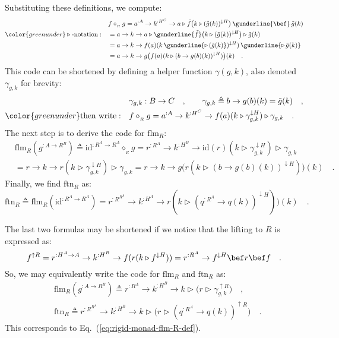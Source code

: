 Substituting these definitions, we compute:
\begin{align*}
 & f\diamond_{_{R}}g=a^{:A}\rightarrow k^{:H^{C}}\rightarrow a\triangleright\tilde{f}\big(k\triangleright(\tilde{g}(k))^{\downarrow H}\big)\,\gunderline{\bef}\,\tilde{g}(k)\\
{\color{greenunder}\triangleright\text{-notation}:}\quad & =a\rightarrow k\rightarrow a\triangleright\gunderline{\tilde{f}}\big(k\triangleright(\tilde{g}(k))^{\downarrow H}\big)\triangleright\tilde{g}(k)\\
 & =a\rightarrow k\rightarrow f(a)(k\,\gunderline{\triangleright\,(\tilde{g}(k)})^{\downarrow H})\,\gunderline{\triangleright\,\tilde{g}(k)}\\
 & =a\rightarrow k\rightarrow g\big(f(a)(k\triangleright(b\rightarrow g(b)(k))^{\downarrow H})\big)(k)\quad.
\end{align*}
This code can be shortened by defining a helper function $\gamma(g,k)$,
also denoted $\gamma_{g,k}$ for brevity:
\begin{align*}
 & \gamma_{g,k}:B\rightarrow C\quad,\quad\quad\gamma_{g,k}\triangleq b\rightarrow g(b)(k)=\tilde{g}(k)\quad,\\
{\color{greenunder}\text{then write}:}\quad & f\diamond_{_{R}}g=a^{:A}\rightarrow k^{:H^{C}}\rightarrow f(a)(k\triangleright\gamma_{g,k}^{\downarrow H})\triangleright\gamma_{g,k}\quad.
\end{align*}
The next step is to derive the code for $\text{flm}_{R}$:
\begin{align*}
 & \text{flm}_{R}(g^{:A\rightarrow R^{B}})\triangleq\text{id}^{:R^{A}\rightarrow R^{A}}\diamond_{_{R}}g=r^{:R^{A}}\rightarrow k^{:H^{B}}\rightarrow\text{id}\left(r\right)(k\triangleright\gamma_{g,k}^{\downarrow H})\triangleright\gamma_{g,k}\\
 & =r\rightarrow k\rightarrow r(k\triangleright\gamma_{g,k}^{\downarrow H})\triangleright\gamma_{g,k}=r\rightarrow k\rightarrow g\big(r(k\triangleright(b\rightarrow g(b)(k))^{\downarrow H})\big)(k)\quad.
\end{align*}
Finally, we find $\text{ftn}_{R}$ as:
\[
\text{ftn}_{R}\triangleq\text{flm}_{R}(\text{id}^{:R^{A}\rightarrow R^{A}})=r^{:R^{R^{A}}}\rightarrow k^{:H^{A}}\rightarrow r(k\triangleright(q^{:R^{A}}\rightarrow q(k))^{\downarrow H})\big)(k)\quad.
\]

The last two formulas may be shortened if we notice that the lifting
to $R$ is expressed as:
\[
f^{\uparrow R}=r^{:H^{A}\rightarrow A}\rightarrow k^{:H^{B}}\rightarrow f(r(k\triangleright f^{\downarrow H}))=r^{:R^{A}}\rightarrow f^{\downarrow H}\bef r\bef f\quad.
\]
So, we may equivalently write the code for $\text{flm}_{R}$ and $\text{ftn}_{R}$
as:
\begin{align*}
 & \text{flm}_{R}(g^{:A\rightarrow R^{B}})\triangleq r^{:R^{A}}\rightarrow k^{:H^{B}}\rightarrow k\triangleright\big(r\triangleright\gamma_{g,k}^{\uparrow R}\big)\quad,\\
 & \text{ftn}_{R}\triangleq r^{:R^{R^{A}}}\rightarrow k^{:H^{B}}\rightarrow k\triangleright\big(r\triangleright(q^{:R^{A}}\rightarrow q(k))^{\uparrow R}\big)\quad.
\end{align*}
This corresponds to Eq.~(\ref{eq:rigid-monad-flm-R-def}).

